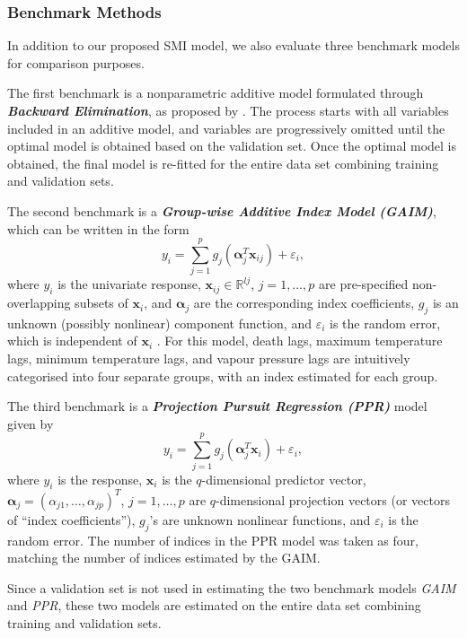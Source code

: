 \documentclass[
  11pt,
  a4paper,
]{article}
\begin{document}
\subsubsection{Benchmark Methods}\label{sec-benchmark}

In addition to our proposed SMI model, we also evaluate three benchmark
models for comparison purposes.

The first benchmark is a nonparametric additive model formulated through
\textbf{\emph{Backward Elimination}}, as proposed by \textcite{FH2012}.
The process starts with all variables included in an additive model, and
variables are progressively omitted until the optimal model is obtained
based on the validation set. Once the optimal model is obtained, the
final model is re-fitted for the entire data set combining training and
validation sets.

The second benchmark is a \textbf{\emph{Group-wise Additive Index Model
(GAIM)}}, which can be written in the form \[
  y_{i} = \sum_{j = 1}^{p} g_{j}(\bm{\alpha}_{j}^{T}\bm{x}_{ij}) + \varepsilon_{i}, 
\] where \(y_{i}\) is the univariate response,
\(\bm{x}_{ij} \in \mathbb{R}^{l{j}}\), \(j = 1, \dots, p\) are
pre-specified non-overlapping subsets of \(\bm{x}_{i}\), and
\(\bm{\alpha}_j\) are the corresponding index coefficients, \(g_{j}\) is
an unknown (possibly nonlinear) component function, and
\(\varepsilon_{i}\) is the random error, which is independent of
\(\bm{x}_{i}\) \autocite{Wang2015-mp,Masselot2022}. For this model,
death lags, maximum temperature lags, minimum temperature lags, and
vapour pressure lags are intuitively categorised into four separate
groups, with an index estimated for each group.

The third benchmark is a \textbf{\emph{Projection Pursuit Regression
(PPR)}} model \autocite{Friedman1981} given by \[
  y_{i} = \sum_{j=1}^{p} {g_{j}(\bm{\alpha}_{j}^{T}\bm{x}_{i})} + \varepsilon_{i},
\] where \(y_{i}\) is the response, \(\bm{x}_{i}\) is the
\(q\)-dimensional predictor vector,
\(\bm{\alpha}_{j} = ( \alpha_{j1}, \dots, \alpha_{jp} )^{T}\),
\(j = 1, \dots, p\) are \(q\)-dimensional projection vectors (or vectors
of ``index coefficients''), \(g_{j}\)'s are unknown nonlinear functions,
and \(\varepsilon_{i}\) is the random error. The number of indices in
the PPR model was taken as four, matching the number of indices
estimated by the GAIM.

Since a validation set is not used in estimating the two benchmark
models \emph{GAIM} and \emph{PPR}, these two models are estimated on the
entire data set combining training and validation sets.
\end{document}
